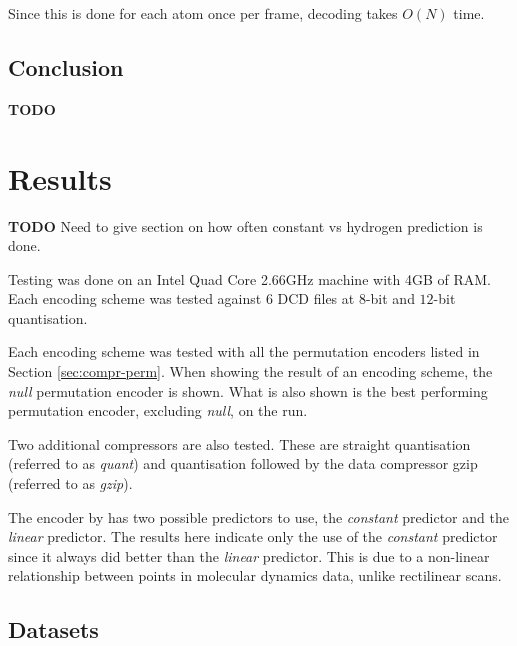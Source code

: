 \documentclass[a4paper]{report}
\newcommand{\todo}{\textbf{TODO} }
\begin{document}
Since this is done for each atom once per frame, decoding takes $O(N)$ time.


\section{Conclusion}

\todo


\chapter{Results}

\todo Need to give section on how often constant vs hydrogen prediction is
done.

Testing was done on an Intel Quad Core 2.66GHz machine with 4GB of RAM. Each
encoding scheme was tested against 6 DCD files at $8$-bit and $12$-bit
quantisation.

Each encoding scheme was tested with all the permutation encoders listed in
Section \ref{sec:compr-perm}. When showing the result of an encoding scheme,
the \emph{null} permutation encoder is shown. What is also shown is the best
performing permutation encoder, excluding \emph{null}, on the run.

Two additional compressors are also tested. These are straight quantisation
(referred to as \emph{quant}) and quantisation followed by the data compressor
gzip (referred to as \emph{gzip}).

The encoder by \citet{gumholdcomp} has two possible predictors to use, the
\emph{constant} predictor and the \emph{linear} predictor. The results here
indicate only the use of the \emph{constant} predictor since it always did
better than the \emph{linear} predictor. This is due to a non-linear
relationship between points in molecular dynamics data, unlike rectilinear
scans.

\section{Datasets}
\end{document}
